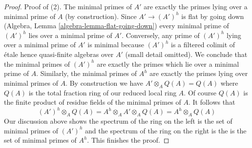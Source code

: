 \documentclass[10pt,a4paper]{amsart}
\theoremstyle{plain}
\theoremstyle{definition}
\theoremstyle{remark}
\numberwithin{equation}{subsection}
\begin{document}
\begin{proof}
\medskip\noindent
Proof of (2). The minimal primes of $A'$ are exactly the primes
lying over a minimal prime of $A$ (by construction).
Since $A' \to (A')^h$ is flat by going down
(Algebra, Lemma \ref{algebra-lemma-flat-going-down})
every minimal prime of $(A')^h$ lies over a minimal prime
of $A'$. Conversely, any prime of $(A')^h$ lying over a
minimal prime of $A'$ is minimal because $(A')^h$ is a filtered
colimit of \'etale hence quasi-finite algebras over $A'$ (small detail omitted).
We conclude that the minimal primes of $(A')^h$
are exactly the primes which lie over a minimal prime of $A$.
Similarly, the minimal primes of $A^h$ are exactly the
primes lying over minimal primes of $A$.
By construction we have $A' \otimes_A Q(A) = Q(A)$ where $Q(A)$
is the total fraction ring of our reduced local ring $A$.
Of course $Q(A)$ is the finite product of residue fields of
the minimal primes of $A$. It follows that
$$
(A')^h \otimes_A Q(A) = A^h \otimes_A A' \otimes_A Q(A) = A^h \otimes_A Q(A)
$$
Our discussion above shows the spectrum of the ring
on the left is the set of minimal primes of $(A')^h$
and the spectrum of the ring on the right is the
is the set of minimal primes of $A^h$. This finishes the proof.
\end{proof}
\end{document}
